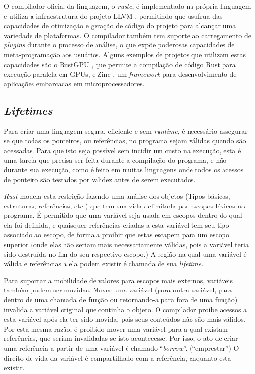 \documentclass[tg]{mdtufsm}
\begin{document}
O compilador oficial da linguagem, o \emph{rustc}, é implementado na própria linguagem e utiliza a
infraestrutura do projeto LLVM \citep{lattner2004}, permitindo que usufrua das capacidades de
otimização e geração de código do projeto para alcançar uma variedade de plataformas. O compilador
também tem suporte ao carregamento de \emph{plugins} durante o processo de análise, o que expõe
poderosas capacidades de meta-programação aos usuários. Alguns exemplos de projetos que utilizam
estas capacidades são o RustGPU \citep{holk2013}, que permite a compilação de código Rust para
execução paralela em GPUs, e Zinc \citep{zinc}, um \emph{framework} para desenvolvimento de
aplicações embarcadas em microprocessadores.

\subsection{\emph{Lifetimes}}

Para criar uma linguagem segura, eficiente e sem \emph{runtime}, é necessário assegurar-se que todas os ponteiros, ou referências, no programa sejam válidas quando são acessadas. Para que isto seja possível sem incidir um custo na execução, esta é uma tarefa que precisa ser feita durante a compilação do programa, e não durante sua execução, como é feito em muitas linguagens onde todos os acessos de ponteiro são testados por validez antes de serem executados.

\emph{Rust} modela esta restrição fazendo uma análise dos objetos (Tipos básicos, estruturas, referências, etc.) que tem sua vida delimitada por escopos léxicos no programa. É permitido que uma variável seja usada em escopos dentro do qual ela foi definida, e quaisquer referências criadas a esta variável tem seu tipo associado ao escopo, de forma a proibir que estas escapem para um escopo superior (onde elas não seriam mais necessariamente válidas, pois a variável teria sido destruída no fim do seu respectivo escopo.) A região na qual uma variável é válida e referências a ela podem existir é chamada de sua \emph{lifetime}.

Para suportar a mobilidade de valores para escopos mais externos, variáveis também podem ser movidas. Mover uma variável (para outra variável, para dentro de uma chamada de função ou retornando-a para fora de uma função) invalida a variável original que continha o objeto. O compilador proíbe acessos a esta variável após ela ter sido movida, pois seus conteúdos não são mais válidos. Por esta mesma razão, é proibido mover uma variável para a qual existam referências, que seriam invalidadas se isto acontecesse. Por isso, o ato de criar uma referência a partir de uma variável é chamado ``\emph{borrow}''. (``emprestar'') O direito de vida da variável é compartilhado com a referência, enquanto esta existir.
\end{document}
